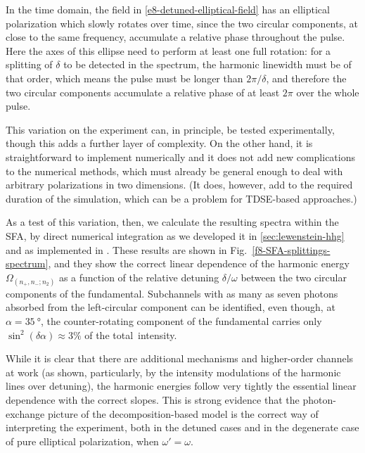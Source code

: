 In the time domain, the field in \eqref{e8-detuned-elliptical-field} has an elliptical polarization which slowly rotates over time, since the two circular components, at close to the same frequency, accumulate a relative phase throughout the pulse. Here the axes of this ellipse need to perform at least one full rotation: for a splitting of $\delta$ to be detected in the spectrum, the harmonic linewidth must be of that order, which means the pulse must be longer than $2\pi/\delta$, and therefore the two circular components accumulate a relative phase of at least $2\pi$ over the whole pulse.

This variation on the experiment can, in principle, be tested experimentally, though this adds a further layer of complexity. On the other hand, it is straightforward to implement numerically and it does not add new complications to the numerical methods, which must already be general enough to deal with arbitrary polarizations in two dimensions. (It does, however, add to the required duration of the simulation, which can be a problem for TDSE-based approaches.)


As a test of this variation, then, we calculate the resulting spectra within the SFA, by direct numerical integration as we developed it in \ref{sec:lewenstein-hhg} and as implemented in . These results are shown in Fig.~\ref{f8-SFA-splittings-spectrum}, and they show the correct linear dependence of the harmonic energy $\Omega_{(n_+,n_-;n_2)}$ as a function of the relative detuning $\delta/\omega$ between the two circular components of the fundamental. Subchannels with as many as seven photons absorbed from the left-circular component can be identified, even though, at $\alpha=\SI{35}{\degree}$, the counter-rotating component of the fundamental carries only $\sin^2(\delta\alpha)\approx 3\%$ of the total~intensity.





While it is clear that there are additional mechanisms and higher-order channels at work (as shown, particularly, by the intensity modulations of the harmonic lines over detuning), the harmonic energies follow very tightly the essential linear dependence with the correct slopes. This is strong evidence that the photon-exchange picture of the decomposition-based model is the correct way of interpreting the experiment, both in the detuned cases and in the degenerate case of pure elliptical polarization, when $\omega'=\omega$.




